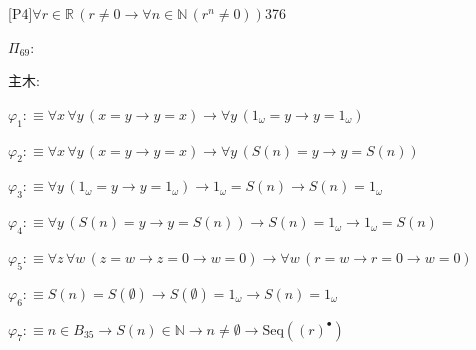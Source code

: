 \begin{fullproof}{[P4]}{$\forall r \in \mathbb{R}\,(r \neq 0 \to \forall n \in \mathbb{N}\,({{r}^{n}} \neq 0))$}{376}
\begin{ptree}
\noLine
{}
\end{ptree}
\noindent$\Pi_{69}$:
\begin{ptree}
\noLine
{}
\end{ptree}
\noindent 主木:
\begin{ptree}
\noLine
{}
\end{ptree}
\begin{abbrevlist}
\item $\varphi_{1} :\equiv \forall x\,\forall y\,(x = y \to y = x) \to \forall y\,(1_{\omega} = y \to y = 1_{\omega})$
\item $\varphi_{2} :\equiv \forall x\,\forall y\,(x = y \to y = x) \to \forall y\,(S(n) = y \to y = S(n))$
\item $\varphi_{3} :\equiv \forall y\,(1_{\omega} = y \to y = 1_{\omega}) \to 1_{\omega} = S(n) \to S(n) = 1_{\omega}$
\item $\varphi_{4} :\equiv \forall y\,(S(n) = y \to y = S(n)) \to S(n) = 1_{\omega} \to 1_{\omega} = S(n)$
\item $\varphi_{5} :\equiv \forall z\,\forall w\,(z = w \to z = 0 \to w = 0) \to \forall w\,(r = w \to r = 0 \to w = 0)$
\item $\varphi_{6} :\equiv S(n) = S(\emptyset) \to S(\emptyset) = 1_{\omega} \to S(n) = 1_{\omega}$
\item $\varphi_{7} :\equiv n \in B_{35} \to S(n) \in \mathbb{N} \to n \neq \emptyset \to \mathrm{Seq}({(r)^{\bullet}})$

\end{abbrevlist}
\end{fullproof}

